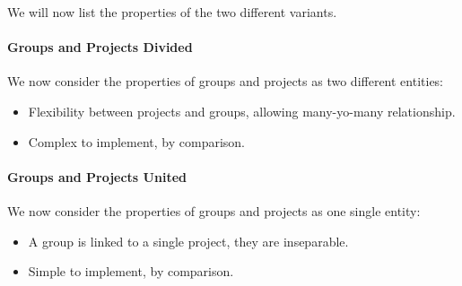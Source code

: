 We will now list the properties of the two different variants. 

\paragraph{Groups and Projects Divided} We now consider the properties of groups and projects as two different entities:
\begin{itemize}
	\item Flexibility between projects and groups, allowing many-yo-many relationship.
	\item Complex to implement, by comparison.
\end{itemize}


\paragraph{Groups and Projects United} We now consider the properties of groups and projects as one single entity:
\begin{itemize}
	\item A group is linked to a single project, they are inseparable.
	\item Simple to implement, by comparison.
\end{itemize}

